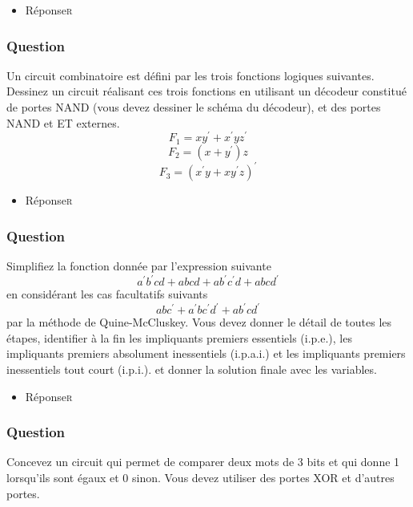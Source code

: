 \documentclass[11pt]{article}
\begin{document}
\begin{itemize}
\item Réponse\hfill{}\textsc{r}
\label{sec:org5041e13}
\end{itemize}

\subsubsection*{Question}
\label{sec:orgd7bb070}
Un circuit combinatoire est défini par les trois fonctions logiques
  suivantes. Dessinez un circuit réalisant ces trois fonctions en
  utilisant un décodeur constitué de portes NAND (vous devez dessiner
  le schéma du décodeur), et des portes NAND et ET
  externes.
  $$
     F_1  = x y^{\prime} + x^{\prime}y
    z^{\prime} 
    $$
  $$
    F_2  =  (x + y^{\prime})z 
    $$
  $$ F_3  =  (x^{\prime}
    y + x y^{\prime} z)^{\prime}
    $$

\begin{itemize}
\item Réponse\hfill{}\textsc{r}
\label{sec:orgc484134}
\end{itemize}

\subsubsection*{Question}
\label{sec:org44772ff}
Simplifiez la fonction donnée par l'expression suivante
  $$
    a^{\prime} b^{\prime} c d + a b c d + a b^{\prime} c^{\prime} d +
	a b c d^{\prime}
    $$
  en considérant les cas facultatifs suivants
  $$
    a b c^{\prime} + a^{\prime} b c^{\prime} d^{\prime} + a b^{\prime}
	c d^{\prime}
    $$
  par la méthode de Quine-McCluskey. Vous devez
  donner le détail de toutes les étapes, identifier à la fin les
  impliquants premiers essentiels (i.p.e.), les impliquants premiers
  absolument inessentiels (i.p.a.i.) et les impliquants premiers
  inessentiels tout court (i.p.i.). et donner la solution finale avec
  les variables.


\begin{itemize}
\item Réponse\hfill{}\textsc{r}
\label{sec:orgeec7112}
\end{itemize}

\subsubsection*{Question}
\label{sec:org976aa49}
Concevez un circuit qui permet de comparer deux mots de 3 bits et qui
  donne 1 lorsqu'ils sont égaux et 0 sinon. Vous devez utiliser des
  portes XOR et d'autres portes.
\end{document}
